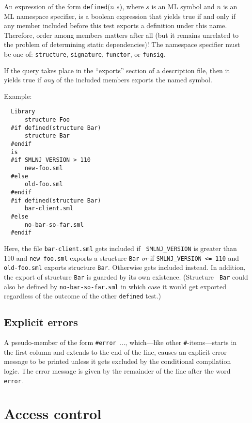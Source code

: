 \documentclass[titlepage,letterpaper]{article}
\begin{document}
An expression of the form {\tt defined}($n$ $s$), where $s$ is an ML
symbol and $n$ is an ML namespace specifier, is a boolean expression
that yields true if and only if any member included before this test
exports a definition under this name.  Therefore, order among members
matters after all (but it remains unrelated to the problem of
determining static dependencies)!  The namespace specifier must be one
of: {\tt structure}, {\tt signature}, {\tt functor}, or {\tt funsig}.

If the query takes place in the ``exports'' section of a description
file, then it yields true if {\em any} of the included members exports
the named symbol.

\noindent Example:

\begin{verbatim}
  Library
      structure Foo
  #if defined(structure Bar)
      structure Bar
  #endif
  is
  #if SMLNJ_VERSION > 110
      new-foo.sml
  #else
      old-foo.sml
  #endif
  #if defined(structure Bar)
      bar-client.sml
  #else
      no-bar-so-far.sml
  #endif
\end{verbatim}

Here, the file {\tt bar-client.sml} gets included if {\tt
SMLNJ\_VERSION} is greater than 110 and {\tt new-foo.sml} exports a
structure {\tt Bar} {\em or} if {\tt SMLNJ\_VERSION <= 110} and {\tt
old-foo.sml} exports structure {\tt Bar}.  Otherwise gets included instead.  In addition, the export of
structure {\tt Bar} is guarded by its own existence.  (Structure {\tt
Bar} could also be defined by {\tt no-bar-so-far.sml} in
which case it would get exported regardless of the outcome of the
other {\tt defined} test.)

\subsection{Explicit errors}

A pseudo-member of the form {\tt \#error $\ldots$}, which---like other
{\tt \#}-items---starts in the first column and extends to the end of
the line, causes an explicit error message to be printed unless it
gets excluded by the conditional compilation logic.  The error message
is given by the remainder of the line after the word {\tt error}.

\section{Access control}
\label{sec:access}
\end{document}
